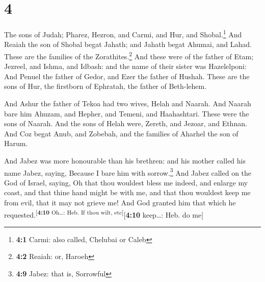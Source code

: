 \hypertarget{section-3}{%
\section{4}\label{section-3}}

 The sons of Judah; Pharez, Hezron, and Carmi, and Hur,
and Shobal.\footnote{\textbf{4:1} Carmi: also called, Chelubai or Caleb}
 And Reaiah the son of Shobal begat Jahath; and Jahath
begat Ahumai, and Lahad. These are the families of the
Zorathites.\footnote{\textbf{4:2} Reaiah: or, Haroeh}  And
these were of the father of Etam; Jezreel, and Ishma, and Idbash: and
the name of their sister was Hazelelponi:  And Penuel the
father of Gedor, and Ezer the father of Hushah. These are the sons of
Hur, the firstborn of Ephratah, the father of Beth-lehem.

 And Ashur the father of Tekoa had two wives, Helah and
Naarah.  And Naarah bare him Ahuzam, and Hepher, and
Temeni, and Haahashtari. These were the sons of Naarah. 
And the sons of Helah were, Zereth, and Jezoar, and Ethnan.
 And Coz begat Anub, and Zobebah, and the families of
Aharhel the son of Harum.

 And Jabez was more honourable than his brethren: and his
mother called his name Jabez, saying, Because I bare him with
sorrow.\footnote{\textbf{4:9} Jabez: that is, Sorrowful} 
And Jabez called on the God of Israel, saying, Oh that thou wouldest
bless me indeed, and enlarge my coast, and that thine hand might be with
me, and that thou wouldest keep me from evil, that it may not grieve me!
And God granted him that which he
requested.\textsuperscript{{[}\textbf{4:10} Oh\ldots: Heb. If thou wilt,
etc{]}}{[}\textbf{4:10} keep\ldots: Heb. do me{]}

